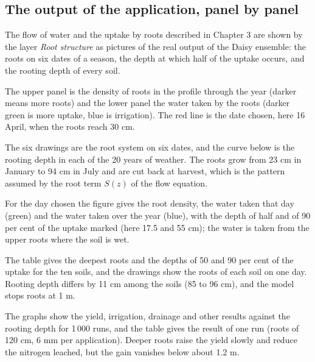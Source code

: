 \subsection{The output of the application, panel by panel}
The flow of water and the uptake by roots described in Chapter 3 are shown by the layer \emph{Root structure} as pictures of the real output of the Daisy ensemble: the roots on six dates of a season, the depth at which half of the uptake occurs, and the rooting depth of every soil.

The upper panel is the density of roots in the profile through the year (darker means more roots) and the lower panel the water taken by the roots (darker green is more uptake, blue is irrigation). The red line is the date chosen, here 16 April, when the roots reach 30 cm.


The six drawings are the root system on six dates, and the curve below is the rooting depth in each of the 20 years of weather. The roots grow from 23 cm in January to 94 cm in July and are cut back at harvest, which is the pattern assumed by the root term $S(z)$ of the flow equation.


For the day chosen the figure gives the root density, the water taken that day (green) and the water taken over the year (blue), with the depth of half and of 90 per cent of the uptake marked (here 17.5 and 55 cm); the water is taken from the upper roots where the soil is wet.


The table gives the deepest roots and the depths of 50 and 90 per cent of the uptake for the ten soils, and the drawings show the roots of each soil on one day. Rooting depth differs by 11 cm among the soils (85 to 96 cm), and the model stops roots at 1 m.


The graphs show the yield, irrigation, drainage and other results against the rooting depth for 1\,000 runs, and the table gives the result of one run (roots of 120 cm, 6 mm per application). Deeper roots raise the yield slowly and reduce the nitrogen leached, but the gain vanishes below about 1.2 m.

